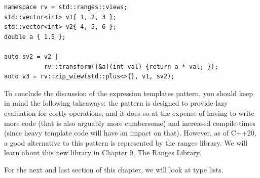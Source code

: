 \begin{lstlisting}[style=styleCXX]
namespace rv = std::ranges::views;
std::vector<int> v1{ 1, 2, 3 };
std::vector<int> v2{ 4, 5, 6 };
double a { 1.5 };

auto sv2 = v2 |
           rv::transform([&a](int val) {return a * val; });
auto v3 = rv::zip_wiew(std::plus<>{}, v1, sv2);
\end{lstlisting}

To conclude the discussion of the expression templates pattern, you should keep in mind the following takeaways: the pattern is designed to provide lazy evaluation for costly operations, and it does so at the expense of having to write more code (that is also arguably more cumbersome) and increased compile-times (since heavy template code will have an impact on that). However, as of C++20, a good alternative to this pattern is represented by the ranges library. We will learn about this new library in Chapter 9, The Ranges Library.

For the next and last section of this chapter, we will look at type lists.













